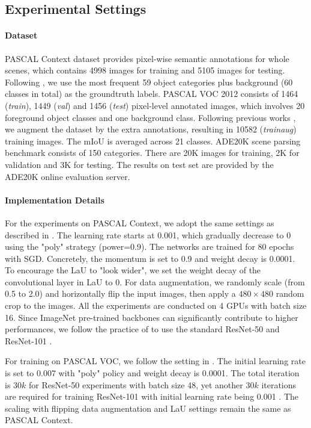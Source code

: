 \documentclass[10pt,twocolumn,letterpaper]{article}
\begin{document}
\subsection{Experimental Settings}
\paragraph{Dataset} PASCAL Context dataset \cite{MottaghiCLCLFUY14} provides pixel-wise semantic annotations for whole scenes, which contains 4998 images for training and 5105 images for testing. Following \cite{LinMSR17, DANet, JPU, EncNet}, we use the most frequent 59 object categories plus background (60 classes in total) as the groundtruth labels. PASCAL VOC 2012 consists of 1464 (\textit{train}), 1449 (\textit{val}) and 1456 (\textit{test}) pixel-level annotated images, which involves 20 foreground object classes and one background class. Following previous works \cite{deeplabv3, HariharanABMM11}, we augment the dataset by the extra annotations, resulting in 10582 (\textit{trainaug}) training images. The mIoU is averaged across 21 classes. ADE20K \cite{ADE20K} scene parsing benchmark consists of 150 categories. There are 20K images for training, 2K for validation and 3K for testing. The results on test set are provided by the ADE20K online evaluation server.

\paragraph{Implementation Details}
For the experiments on PASCAL Context, we adopt the same settings as described in \cite{EncNet, JPU}. The learning rate starts at 0.001, which gradually decrease to 0 using the "poly" strategy (power=0.9). The networks are trained for 80 epochs with SGD. Concretely, the momentum is set to 0.9 and weight decay is 0.0001. To encourage the LaU to "look wider", we set the weight decay of the convolutional layer in LaU to 0. For data augmentation, we randomly scale (from 0.5 to 2.0)  and horizontally flip the input images, then apply a $480\times480$ random crop to the images. All the experiments are conducted on 4 GPUs with batch size 16. Since ImageNet pre-trained backbones can significantly contribute to higher performances, we follow the practice of \cite{EncNet, JPU, DANet, DUpsampling} to use the standard ResNet-50 and ResNet-101 \cite{resnet}. 

For training on PASCAL VOC, we follow the setting in \cite{DUpsampling, deeplabv3}. The initial learning rate is set to 0.007 with "poly" policy and weight decay is 0.0001. The total iteration is $30k$ for ResNet-50 experiments with batch size 48, yet another $30k$ iterations are required for training ResNet-101 with initial learning rate being 0.001 \cite{deeplabv3}. The scaling with flipping data augmentation and LaU settings remain the same as PASCAL Context. 
\end{document}
